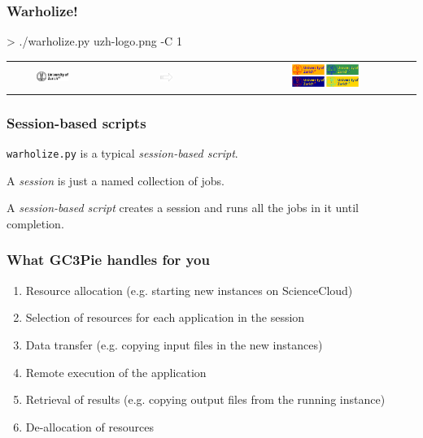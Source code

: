\documentclass[english,serif,mathserif,usenames,dvipsnames]{beamer}
\begin{document}
\begin{frame}
  \frametitle{Warholize!}

\begin{semiverbatim}
    > ./warholize.py uzh-logo.png -C 1
\end{semiverbatim}

  \begin{tabular}[c]{ccc}
    \includegraphics[width=0.4\textwidth]{fig/uzh-logo.png}
    &
    \includegraphics[width=0.1\textwidth]{fig/arrow.pdf}
    &
    \includegraphics[width=0.4\textwidth]{fig/warholized-uzh-logo.png}
  \end{tabular}
\end{frame}


\begin{frame}
  \frametitle{Session-based scripts}

  \texttt{warholize.py} is a typical \emph{session-based script}.

  \+ A \emph{session} is just a named collection of jobs.

  \+ A \emph{session-based script} creates a session and runs all the
  jobs in it until completion.
\end{frame}

\begin{frame}
  \frametitle{What GC3Pie handles for you}

  \begin{enumerate}
  \item Resource allocation (e.g. starting new instances on
    ScienceCloud)
  \item Selection of resources for each application in the session
  \item Data transfer (e.g. copying input files in the new instances)
  \item Remote execution of the application
  \item Retrieval of results (e.g. copying output files from the
    running instance)
  \item De-allocation of resources
  \end{enumerate}

\end{frame}
\end{document}
